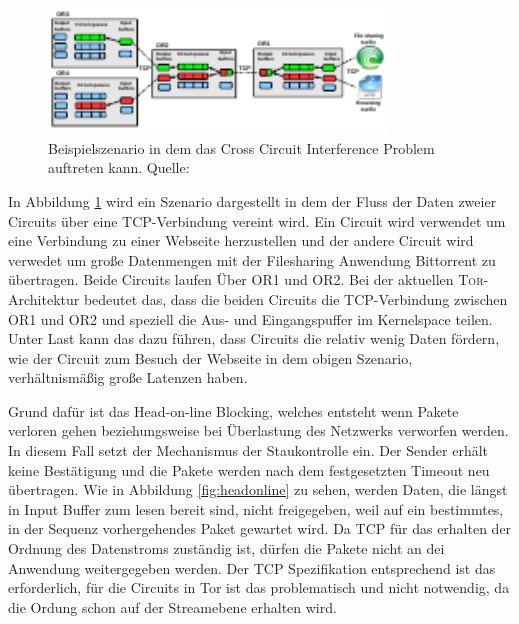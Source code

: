 \documentclass[fleqn,envcountsame,runningheads,10pt,a4paper]{llncs}
\begin{document}
\begin{figure}[h]
  \begin{center}
    \includegraphics[width=0.8\textwidth]{pics/BufferPic.pdf}
    \caption{Beispielszenario in dem das Cross Circuit Interference Problem auftreten kann. Quelle: \cite{pctcp} }
    \label{fig:buffer} 
  \end{center} 
\end{figure} 

In Abbildung \ref{fig:buffer} wird ein Szenario dargestellt in dem der Fluss der Daten zweier Circuits über eine TCP-Verbindung vereint wird. Ein Circuit wird verwendet um eine Verbindung zu einer Webseite herzustellen und der andere Circuit wird verwedet um große Datenmengen mit der Filesharing Anwendung Bittorrent zu übertragen. Beide Circuits laufen Über OR1 und OR2. Bei der aktuellen \textsc{Tor}-Architektur bedeutet das, dass die beiden Circuits die TCP-Verbindung zwischen OR1 und OR2 und speziell die Aus- und Eingangspuffer im Kernelspace teilen. Unter Last kann das dazu führen, dass Circuits die relativ wenig Daten fördern, wie der Circuit zum Besuch der Webseite in dem obigen Szenario, verhältnismäßig große Latenzen haben.


Grund dafür ist das Head-on-line Blocking, welches entsteht wenn Pakete verloren gehen beziehungsweise bei Überlastung des Netzwerks verworfen werden. In diesem Fall setzt der Mechanismus der Staukontrolle ein. Der Sender erhält keine Bestätigung und die Pakete werden nach dem festgesetzten Timeout neu übertragen. Wie in Abbildung \ref{fig:headonline} zu sehen, werden Daten, die längst in Input Buffer zum lesen bereit sind, nicht freigegeben, weil auf ein bestimmtes, in der Sequenz vorhergehendes Paket gewartet wird. Da TCP für das erhalten der Ordnung des Datenstroms zuständig ist, dürfen die Pakete nicht an dei Anwendung weitergegeben werden. Der TCP Spezifikation entsprechend ist das erforderlich, für die Circuits in Tor ist das problematisch und nicht notwendig, da die Ordung schon auf der Streamebene erhalten wird.
\end{document}
